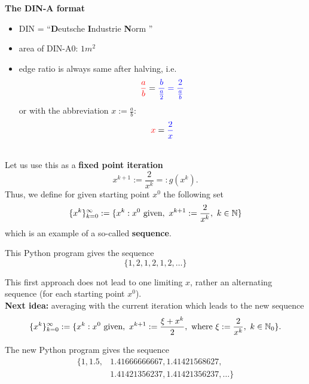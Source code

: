 {\begin{itemize}
\begin{frame} 
\label{realnumbers}
\textbf{The DIN-A format}\vspace{-0.15cm}
\begin{minipage}[c]{0.51\textwidth}
	\begin{itemize}
		\item DIN =   ``\textbf{D}eutsche \textbf{I}ndustrie \textbf{N}orm ''
		\item area of DIN-A0: $1m^2$
		\item edge ratio is always same after halving, i.e.
		\[
		{\color{red}\frac{a}{b}}={\color{blue}\frac{b}{\frac{a}{2}}=\frac{2}{\frac{a}{b}}}
		\]
		or with the abbreviation $x:=\frac{a}{b}$:
		\[
		{\color{red}x}={\color{blue}\frac{2}{x}}
		\]
	\end{itemize}
\end{minipage}
\begin{minipage}[c]{0.49\textwidth}
\end{minipage}
~\\
Let us use this as a \textbf{fixed point iteration}
\[
x^{k+1}:=\frac{2}{x^{k}} =: g(x^k).
\]
Thus, we define for given starting point $x^0$ the following set
\[
\{x^k\}_{k=0}^\infty:=\{x^k: x^0 \text{ given},~ x^{k+1}:=\frac{2}{x^{k}},~k\in{\mathbb{N}}\}
\]
which is an example of a so-called \textbf{\textbf{sequence}}.
\end{frame}


\begin{frame} 
\begin{minipage}[c]{0.5\textwidth}
%	
\end{minipage}
\begin{minipage}[c]{0.5\textwidth}
This Python program gives the sequence
\[
\{1,2,1,2,1,2,\ldots\}
\]
\end{minipage}
This first approach does not lead to one limiting $x$, rather an alternating sequence (for each starting point $x^0$).\\[10pt]
\textbf{Next idea:} averaging with the current iteration which leads to the new sequence
\[
\{x^k\}_{k=0}^\infty:=\{x^k: x^0 \text{ given},~ x^{k+1}:=\frac{\xi+x^{k}}{2}, \text{ where }  \xi:=\frac{2}{x^{k}},~ k\in{\mathbb{N}}_0\}.
\]
\begin{minipage}[c]{0.5\textwidth}
%	
\end{minipage}
\begin{minipage}[c]{0.5\textwidth}
The new Python program gives the sequence
\begin{align*}
\{1,1.5,
&1.41666666667,1.41421568627,\\
&1.41421356237,
1.41421356237,
\ldots\}
\end{align*}
\end{minipage}


\end{frame}
\end{itemize}}
